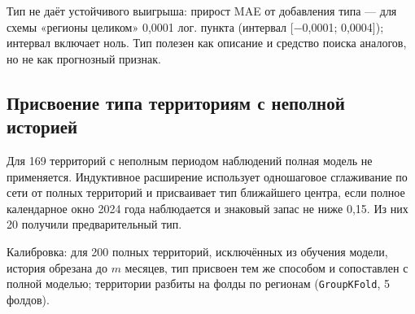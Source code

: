 \documentclass[11pt,a4paper]{article}
\begin{document}
\endgroup

Тип не даёт устойчивого выигрыша: прирост MAE от добавления типа --- для схемы «регионы целиком» 0,0001 лог. пункта (интервал {[}−0,0001; 0,0004{]}); интервал включает ноль. Тип полезен как описание и средство поиска аналогов, но не как прогнозный признак.

\subsection{Присвоение типа территориям с неполной историей}\label{ux43fux440ux438ux441ux432ux43eux435ux43dux438ux435-ux442ux438ux43fux430-ux442ux435ux440ux440ux438ux442ux43eux440ux438ux44fux43c-ux441-ux43dux435ux43fux43eux43bux43dux43eux439-ux438ux441ux442ux43eux440ux438ux435ux439}

Для 169 территорий с неполным периодом наблюдений полная модель не применяется. Индуктивное расширение использует одношаговое сглаживание по сети от полных территорий и присваивает тип ближайшего центра, если полное календарное окно 2024 года наблюдается и знаковый запас не ниже 0,15. Из них 20 получили предварительный тип.

Калибровка: для 200 полных территорий, исключённых из обучения модели, история обрезана до \(m\) месяцев, тип присвоен тем же способом и сопоставлен с полной моделью; территории разбиты на фолды по регионам (\texttt{GroupKFold}, 5 фолдов).

\begingroup\footnotesize\setlength{\tabcolsep}{4pt}
\end{document}

